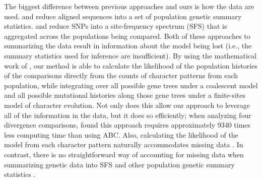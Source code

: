 The biggest difference between previous approaches and ours is how the data are
used.
\citet{Chan2014} and \citet{Gehara2017}
reduce aligned sequences into a set of population genetic summary statistics.
\citet{Xue2015} and \citet{Xue2017}
reduce SNPs into a site-frequency spectrum (SFS) that is aggregated across the
populations being compared.
Both of these approaches to summarizing the data result in information about
the model being lost
(i.e., the summary statistics used for inference are insufficient).
By using the mathematical work of \citet{Bryant2012}, our method is able to
calculate the likelihood of the population histories of the comparisons
directly from the counts of character patterns from each population, while
integrating over all possible gene trees under a coalescent model and all
possible mutational histories along those gene trees under a finite-sites model
of character evolution.
Not only does this allow our approach to leverage all of the information in the
data, but it does so efficiently;
when analyzing four divergence comparisons,
\citet{Oaks2018ecoevolity} found this approach requires approximately 9340 times
less computing time than using ABC.
Also, calculating the likelihood of the model from each character pattern
naturally accommodates missing data \citep{Oaks2018ecoevolity}.
In contrast, there is no straightforward way of accounting for missing data
when summarizing genetic data into SFS and other population genetic summary
statistics \citep{Hahn2018}.





